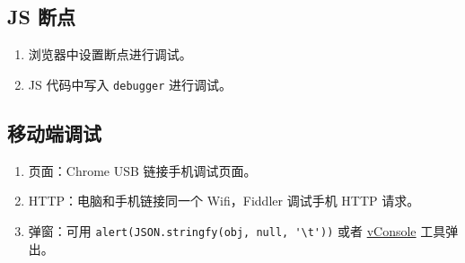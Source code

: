 \subsection{JS 断点}\label{js-ux65adux70b9}

\begin{enumerate}
\def\labelenumi{\arabic{enumi}.}
\tightlist
\item
  浏览器中设置断点进行调试。
\item
  JS 代码中写入 \lstinline!debugger! 进行调试。
\end{enumerate}

\subsection{移动端调试}\label{ux79fbux52a8ux7aefux8c03ux8bd5}

\begin{enumerate}
\def\labelenumi{\arabic{enumi}.}
\tightlist
\item
  页面：Chrome USB 链接手机调试页面。
\item
  HTTP：电脑和手机链接同一个 Wifi，Fiddler 调试手机 HTTP 请求。
\item
  弹窗：可用 \lstinline!alert(JSON.stringfy(obj, null, '\t'))! 或者
  \href{https://github.com/Tencent/vConsole}{vConsole} 工具弹出。
\end{enumerate}
